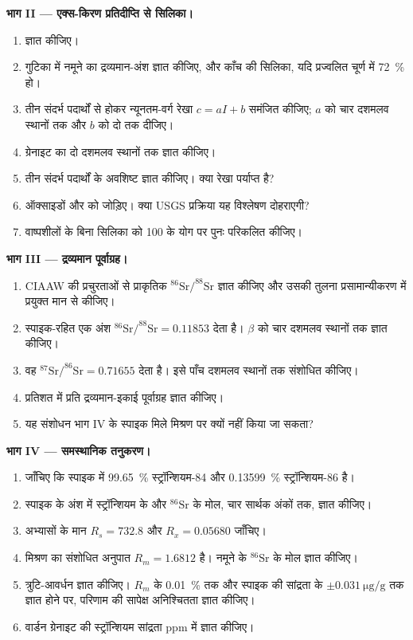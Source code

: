 \begin{problem}
\noindent\textbf{भाग II --- एक्स-किरण प्रतिदीप्ति से सिलिका।}
\begin{enumerate}[resume]
  \item {} ज्ञात कीजिए।
  \item गुटिका में नमूने का द्रव्यमान-अंश ज्ञात कीजिए, और काँच की सिलिका, यदि
        प्रज्वलित चूर्ण में \qty{72}{\percent} हो।
  \item तीन संदर्भ पदार्थों से होकर न्यूनतम-वर्ग रेखा $c = aI + b$ समंजित कीजिए; $a$ को
        चार दशमलव स्थानों तक और $b$ को दो तक दीजिए।
  \item ग्रेनाइट का  दो दशमलव स्थानों तक ज्ञात कीजिए।
  \item तीन संदर्भ पदार्थों के अवशिष्ट ज्ञात कीजिए। क्या रेखा पर्याप्त है?
  \item ऑक्साइडों और  को जोड़िए। क्या USGS प्रक्रिया यह विश्लेषण दोहराएगी?
  \item वाष्पशीलों के बिना सिलिका को 100 के योग पर पुनः परिकलित कीजिए।
\end{enumerate}

\noindent\textbf{भाग III --- द्रव्यमान पूर्वाग्रह।}
\begin{enumerate}[resume]
  \item CIAAW की प्रचुरताओं से प्राकृतिक $^{86}\mathrm{Sr}/^{88}\mathrm{Sr}$ ज्ञात कीजिए और उसकी तुलना
        प्रसामान्यीकरण में प्रयुक्त मान से कीजिए।
  \item स्पाइक-रहित एक अंश $^{86}\mathrm{Sr}/^{88}\mathrm{Sr} = 0.11853$ देता है। $\beta$ को
        चार दशमलव स्थानों तक ज्ञात कीजिए।
  \item वह $^{87}\mathrm{Sr}/^{86}\mathrm{Sr} = 0.71655$ देता है। इसे पाँच दशमलव स्थानों तक संशोधित कीजिए।
  \item प्रतिशत में प्रति द्रव्यमान-इकाई पूर्वाग्रह ज्ञात कीजिए।
  \item यह संशोधन भाग IV के स्पाइक मिले मिश्रण पर क्यों नहीं किया जा सकता?
\end{enumerate}

\noindent\textbf{भाग IV --- समस्थानिक तनुकरण।}
\begin{enumerate}[resume]
  \item जाँचिए कि स्पाइक में \qty{99.65}{\percent} स्ट्रॉन्शियम-84 और \qty{0.13599}{\percent}
        स्ट्रॉन्शियम-86 है।
  \item स्पाइक के अंश में स्ट्रॉन्शियम के और $^{86}\mathrm{Sr}$ के मोल, चार सार्थक अंकों तक,
        ज्ञात कीजिए।
  \item अभ्यासों के मान $R_s = 732.8$ और $R_x = 0.05680$ जाँचिए।
  \item मिश्रण का संशोधित अनुपात $R_m = 1.6812$ है। नमूने के $^{86}\mathrm{Sr}$ के मोल
        ज्ञात कीजिए।
  \item त्रुटि-आवर्धन ज्ञात कीजिए। $R_m$ के \qty{0.01}{\percent} तक और स्पाइक की
        सांद्रता के $\pm\qty{0.031}{\micro\gram\per\gram}$ तक ज्ञात होने पर, परिणाम की सापेक्ष
        अनिश्चितता ज्ञात कीजिए।
  \item वार्डन ग्रेनाइट की स्ट्रॉन्शियम सांद्रता ppm में ज्ञात कीजिए।
\end{enumerate}
\end{problem}
